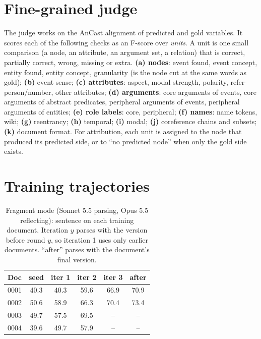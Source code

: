 \section{Fine-grained judge}
\label{app:judge}
The judge works on the AnCast alignment of predicted and gold variables. It scores each of the following checks as an F-score over \emph{units}. A unit is one small comparison (a node, an attribute, an argument set, a relation) that is correct, partially correct, wrong, missing or extra.
\textbf{(a) nodes}: event found, event concept, entity found, entity concept, granularity (is the node cut at the same words as gold);
\textbf{(b)} event sense;
\textbf{(c) attributes}: aspect, modal strength, polarity, refer-person/number, other attributes;
\textbf{(d) arguments}: core arguments of events, core arguments of abstract predicates, peripheral arguments of events, peripheral arguments of entities;
\textbf{(e) role labels}: core, peripheral;
\textbf{(f) names}: name tokens, wiki;
\textbf{(g)} reentrancy;
\textbf{(h)} temporal; \textbf{(i)} modal; \textbf{(j)} coreference chains and subsets;
\textbf{(k)} document format.
For attribution, each unit is assigned to the node that produced its predicted side, or to ``no predicted node'' when only the gold side exists.

\section{Training trajectories}
\label{app:traj}
\begin{table}[h]
\centering\small
\setlength{\tabcolsep}{4pt}
\begin{tabular}{@{}lccccc@{}}
\toprule
Doc & seed & iter 1 & iter 2 & iter 3 & after \\
\midrule
0001 & 40.3 & 40.3 & 59.6 & 66.9 & 70.9 \\
0002 & 50.6 & 58.9 & 66.3 & 70.4 & 73.4 \\
0003 & 49.7 & 57.5 & 69.5 & -- & -- \\
0004 & 39.6 & 49.7 & 57.9 & -- & -- \\
\bottomrule
\end{tabular}
\caption{Fragment mode (Sonnet 5.5 parsing, Opus 5.5 reflecting): sentence \F on each training document. Iteration $y$ parses with the version before round $y$, so iteration 1 uses only earlier documents. ``after'' parses with the document's final version.}
\label{tab:traj}
\end{table}

